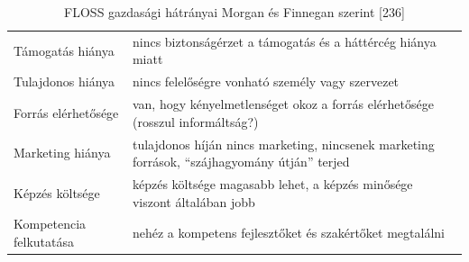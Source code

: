 \documentclass[12pt,magyar,a4paper,oneside]{scrreprt}
\begin{document}
\hypertarget{tbl:Huxe1truxe1ny}{}
\begin{longtable}[]{@{}ll@{}}
\caption{\label{tbl:Huxe1truxe1ny}FLOSS gazdasági hátrányai Morgan és
Finnegan szerint {[}236{]}}\tabularnewline
\toprule
\endhead
\begin{minipage}[t]{0.19\columnwidth}\raggedright
Támogatás hiánya\strut
\end{minipage} & \begin{minipage}[t]{0.75\columnwidth}\raggedright
nincs biztonságérzet a támogatás és a háttércég hiánya miatt\strut
\end{minipage}\tabularnewline
\begin{minipage}[t]{0.19\columnwidth}\raggedright
Tulajdonos hiánya\strut
\end{minipage} & \begin{minipage}[t]{0.75\columnwidth}\raggedright
nincs felelőségre vonható személy vagy szervezet\strut
\end{minipage}\tabularnewline
\begin{minipage}[t]{0.19\columnwidth}\raggedright
Forrás elérhetősége\strut
\end{minipage} & \begin{minipage}[t]{0.75\columnwidth}\raggedright
van, hogy kényelmetlenséget okoz a forrás elérhetősége (rosszul
informáltság?)\strut
\end{minipage}\tabularnewline
\begin{minipage}[t]{0.19\columnwidth}\raggedright
Marketing hiánya\strut
\end{minipage} & \begin{minipage}[t]{0.75\columnwidth}\raggedright
tulajdonos híján nincs marketing, nincsenek marketing források,
``szájhagyomány útján'' terjed\strut
\end{minipage}\tabularnewline
\begin{minipage}[t]{0.19\columnwidth}\raggedright
Képzés költsége\strut
\end{minipage} & \begin{minipage}[t]{0.75\columnwidth}\raggedright
képzés költsége magasabb lehet, a képzés minősége viszont általában
jobb\strut
\end{minipage}\tabularnewline
\begin{minipage}[t]{0.19\columnwidth}\raggedright
Kompetencia felkutatása\strut
\end{minipage} & \begin{minipage}[t]{0.75\columnwidth}\raggedright
nehéz a kompetens fejlesztőket és szakértőket megtalálni\strut
\end{minipage}\tabularnewline
\bottomrule
\end{longtable}
\end{document}
